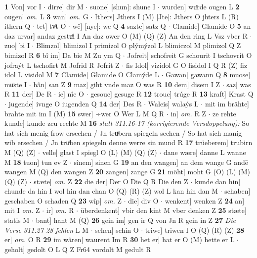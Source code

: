 \documentclass[8pt,a4paper,notitlepage]{article}
\begin{document}
\begin{table}[ht]
\begin{minipage}[t]{0.5\linewidth}
\textbf{1} Von] vor I  $\cdot$ dirre] dir M  $\cdot$ suone] [shun]: shune I  $\cdot$ wurden] wuͯrde ougen L \textbf{2} ougen] \textit{om.} L \textbf{3} wan] \textit{om.} G  $\cdot$ Ithers] Jthers I (M) [Jte]: Jthers  O jhters L (R) ithern Q  $\cdot$ tet] tvͦt O  $\cdot$ wê] [nye]: we Q \textbf{4} sazte] satz Q  $\cdot$ Clamide] Glamide O \textbf{5} an daz urvar] andaz gestuͤl I An daz ower O (M) (Q) (Z) An den ring L Vsz vber R  $\cdot$ zuo] bi I  $\cdot$ Blimzol] blimizol I primizol O plýmýzol L blimiczol M plimizol Q Z bimizol R \textbf{6} bî im] Da bie M Zu ym Q  $\cdot$ Jofreit] schofreit G schourit I tschovrit O jofraýt L tschofirt M Jofrid R Jofrit Z  $\cdot$ fis Idol] vizidol G O fisidol I Q R (Z) fiz idol L visidol M \textbf{7} Clamide] Glamide O Clamýde L  $\cdot$ Gawan] gawann Q \textbf{8} muose] muͤste I  $\cdot$ hân] san Z \textbf{9} maz] giht vnde maz O was R \textbf{10} dem] disem I Z  $\cdot$ saz] was R \textbf{11} der] De R  $\cdot$ ie] nîe O  $\cdot$ gesouc] gesuge R \textbf{12} trouc] trúge R \textbf{13} kraft] Krast Q  $\cdot$ jugende] ivnge O iugenden Q \textbf{14} der] Des R  $\cdot$ Waleis] walaýs L  $\cdot$ mit im brâhte] brahte mit im I (M) \textbf{15} swer] ÷wer O Wer L M Q R  $\cdot$ in] \textit{om.} R Z  $\cdot$ ze rehte kunde] kunde zcu rechte M \textbf{16} \textit{statt 311.16-17 (korrigierende Versdoppelung):} So hat sich menig frow ersechen / Jn truͯbern spiegeln sechen / So hat sich manig wib ersechen / Jn truͯben spiegeln denne werre sin mund R  \textbf{17} trüeberem] trubirn M (Q) (Z)  $\cdot$ velle] glast I spiegl O (L) (M) (Q) (Z)  $\cdot$ dane wære] danne L wanne M \textbf{18} tuon] tun ev Z  $\cdot$ sînem] sinen G \textbf{19} an den wangen] an dem wange G andē wangen M (Q) den wangen Z \textbf{20} zangen] zange G \textbf{21} möht] moht G (O) (L) (M) (Q) (Z)  $\cdot$ stæte] \textit{om.} Z \textbf{22} die der] Der O Die Q R Die den Z  $\cdot$ kunde dan hin] chunde da hin I wol hin dan chan O (Q) (R) (Z) wol L kan hin dan M  $\cdot$ schaben] geschaben O schaden Q \textbf{23} wîp] \textit{om.} Z  $\cdot$ die] div O  $\cdot$ wenkent] wenken Z \textbf{24} an] mit I \textit{om.} Z  $\cdot$ ir] \textit{om.} R  $\cdot$ überdenkent] vbir den kint M vber denken Z \textbf{25} stæte] statis M  $\cdot$ bant] hant M (Q) \textbf{26} gein im] gen ir Q von Jn R gein in Z \textbf{27} \textit{Die Verse 311.27-28 fehlen} L M   $\cdot$ sehen] schin O  $\cdot$ triwe] triwen I O (Q) (R) (Z) \textbf{28} er] \textit{om.} O R \textbf{29} im wâren] waurent Im R \textbf{30} het er] hat er O (M) hette er L  $\cdot$ geholt] gedolt O L Q Z Fr64 vordolt M gedult R \newline

\end{minipage}
\end{table}
\end{document}
